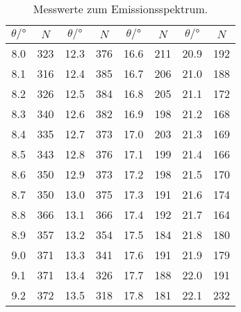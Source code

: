 \begin{table}[H]
  \centering
  \caption{Messwerte zum Emissionsspektrum.}
  \begin{tabular}{S[table-format=2.1] c | S[table-format=2.1] c | S[table-format=2.1] c | S[table-format=2.1] c}
  \toprule
  {$\theta /\si{\degree}$} &
  {$N$} &
  {$\theta /\si{\degree}$} &
  {$N$} &
  {$\theta /\si{\degree}$} &
  {$N$} &
  {$\theta /\si{\degree}$} &
  {$N$} \\
  \midrule
\num{8.0}  & \num{323}  &   \num{12.3} & \num{376}  &   \num{16.6} & \num{211}  &   \num{20.9} & \num{192}  \\
\num{8.1}  & \num{316}  &   \num{12.4} & \num{385}  &   \num{16.7} & \num{206}  &   \num{21.0} & \num{188}  \\
\num{8.2}  & \num{326}  &   \num{12.5} & \num{384}  &   \num{16.8} & \num{205}  &   \num{21.1} & \num{172}  \\ 
\num{8.3}  & \num{340}  &   \num{12.6} & \num{382}  &   \num{16.9} & \num{198}  &   \num{21.2} & \num{168}  \\
\num{8.4}  & \num{335}  &   \num{12.7} & \num{373}  &   \num{17.0} & \num{203}  &   \num{21.3} & \num{169}  \\
\num{8.5}  & \num{343}  &   \num{12.8} & \num{376}  &   \num{17.1} & \num{199}  &   \num{21.4} & \num{166}  \\
\num{8.6}  & \num{350}  &   \num{12.9} & \num{373}  &   \num{17.2} & \num{198}  &   \num{21.5} & \num{170}  \\
\num{8.7}  & \num{350}  &   \num{13.0} & \num{375}  &   \num{17.3} & \num{191}  &   \num{21.6} & \num{174}  \\
\num{8.8}  & \num{366}  &   \num{13.1} & \num{366}  &   \num{17.4} & \num{192}  &   \num{21.7} & \num{164}  \\
\num{8.9}  & \num{357}  &   \num{13.2} & \num{354}  &   \num{17.5} & \num{184}  &   \num{21.8} & \num{180}  \\
\num{9.0}  & \num{371}  &   \num{13.3} & \num{341}  &   \num{17.6} & \num{191}  &   \num{21.9} & \num{179}  \\
\num{9.1}  & \num{371}  &   \num{13.4} & \num{326}  &   \num{17.7} & \num{188}  &   \num{22.0} & \num{191}  \\
\num{9.2}  & \num{372}  &   \num{13.5} & \num{318}  &   \num{17.8} & \num{181}  &   \num{22.1} & \num{232}  \\

\end{tabular}
\end{table}
